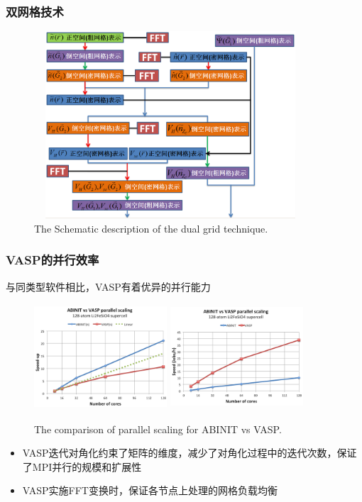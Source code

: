 \frame
{
	\frametitle{双网格技术}
\begin{figure}[h!]
	\vspace{-0.15in}
\centering
\includegraphics[height=2.75in,width=4.0in,viewport=0 0 800 600,clip]{Figures/dual_grid-2.png}
\caption{\tiny \textrm{The Schematic description of the dual grid technique.}}%
\label{PAW_dualgrid}
\end{figure} 
}

\frame
{
	\frametitle{\textrm{VASP}的并行效率}
	与同类型软件相比，\textrm{VASP}有着优异的并行能力
\begin{figure}[h!]
	\vspace{-0.15in}
\centering
\includegraphics[height=1.55in,width=1.95in,viewport=0 0 240 200,clip]{Figures/VASP-abinit_Li128-1.png}
\includegraphics[height=1.55in,width=1.95in,viewport=0 0 240 200,clip]{Figures/VASP-abinit_Li128-2.png}
\caption{\tiny \textrm{The comparison of parallel scaling for ABINIT vs VASP.}}%
\label{ABINIT_vs_VASP}
\end{figure} 
\begin{itemize}
	\item \textrm{VASP}迭代对角化约束了矩阵的维度，减少了对角化过程中的迭代次数，保证了\textrm{MPI}并行的规模和扩展性
	\item \textrm{VASP}实施\textrm{FFT}变换时，保证各节点上处理的网格负载均衡
\end{itemize}
}

